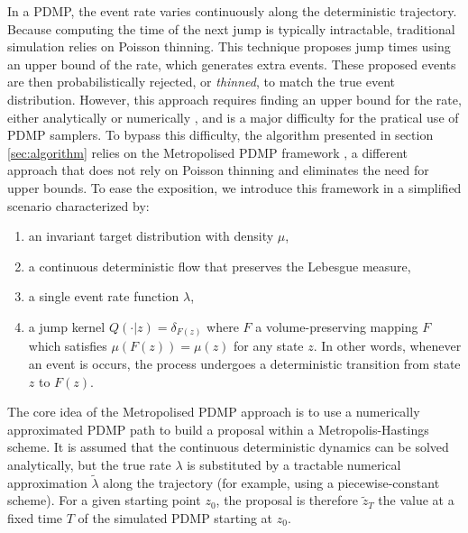 \documentclass{article}
\begin{document}
In a PDMP, the event rate varies continuously along the deterministic trajectory. Because computing the time of the next jump is typically intractable, traditional simulation relies on Poisson thinning. This technique proposes jump times using an upper bound of the rate, which generates extra events. These proposed events are then probabilistically rejected, or \textit{thinned}, to match the true event distribution. However, this approach requires finding an upper bound for the rate, either analytically or numerically \cite{sutton2023concave,corbella2022automatic,andral2024automated}, and is a major difficulty for the pratical use of PDMP samplers. To bypass this difficulty, the algorithm presented in section \ref{sec:algorithm} relies on the Metropolised PDMP framework \cite{chevallier2025practicalpdmpsamplingmetropolis}, a different approach that does not rely on Poisson thinning and eliminates the need for upper bounds.
To ease the exposition, we introduce this framework in a simplified scenario characterized by:
\begin{enumerate}
    \item an invariant target distribution with density $\mu$,
    \item a continuous deterministic flow that preserves the Lebesgue measure,
    \item a single event rate function $\lambda$,
    \item a jump kernel $Q(\cdot|z) = \delta_{F(z)}$ where $F$ a volume-preserving mapping $F$ which satisfies $\mu(F(z)) = \mu(z)$ for any state $z$. In other words, whenever an event is occurs, the process undergoes a deterministic transition from state $z$ to $F(z)$.
\end{enumerate}

The core idea of the Metropolised PDMP approach is to use a numerically approximated PDMP path to build a proposal within a Metropolis-Hastings scheme. It is assumed that the continuous deterministic dynamics can be solved analytically, but the true rate $\lambda$ is substituted by a tractable numerical approximation $\tilde{\lambda}$ along the trajectory (for example, using a piecewise-constant scheme). For a given starting point $z_0$, the proposal is therefore $\tilde{z}_T$ the value at a fixed time $T$ of the simulated PDMP starting at $z_0$.
\end{document}
